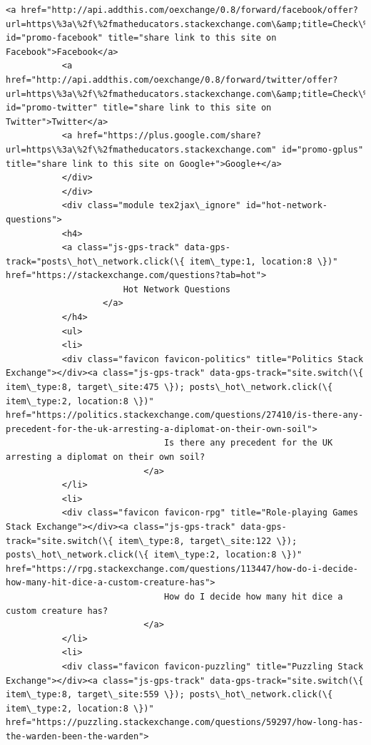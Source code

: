 \documentclass[11pt]{article}
\begin{document}
\begin{Verbatim}[commandchars=\\\{\}]
           <a href="http://api.addthis.com/oexchange/0.8/forward/facebook/offer?url=https\%3a\%2f\%2fmatheducators.stackexchange.com\&amp;title=Check\%20out\%20the\%20new\%20Mathematics\%20Educators\%20Stack\%20Exchange\%20Q\%26A\%20site\%20from\%20Stack\%20Exchange\&amp;username=stackoverflow" id="promo-facebook" title="share link to this site on Facebook">Facebook</a>
           <a href="http://api.addthis.com/oexchange/0.8/forward/twitter/offer?url=https\%3a\%2f\%2fmatheducators.stackexchange.com\&amp;title=Check\%20out\%20the\%20new\%20Mathematics\%20Educators\%20Stack\%20Exchange\%20QnA\%20site\%20from\%20\%40StackExchange\&amp;username=stackoverflow\&amp;template=\%7B\%7Btitle\%7D\%7D\%20\%7B\%7Burl\%7D\%7D" id="promo-twitter" title="share link to this site on Twitter">Twitter</a>
           <a href="https://plus.google.com/share?url=https\%3a\%2f\%2fmatheducators.stackexchange.com" id="promo-gplus" title="share link to this site on Google+">Google+</a>
           </div>
           </div>
           <div class="module tex2jax\_ignore" id="hot-network-questions">
           <h4>
           <a class="js-gps-track" data-gps-track="posts\_hot\_network.click(\{ item\_type:1, location:8 \})" href="https://stackexchange.com/questions?tab=hot">
                       Hot Network Questions
                   </a>
           </h4>
           <ul>
           <li>
           <div class="favicon favicon-politics" title="Politics Stack Exchange"></div><a class="js-gps-track" data-gps-track="site.switch(\{ item\_type:8, target\_site:475 \}); posts\_hot\_network.click(\{ item\_type:2, location:8 \})" href="https://politics.stackexchange.com/questions/27410/is-there-any-precedent-for-the-uk-arresting-a-diplomat-on-their-own-soil">
                               Is there any precedent for the UK arresting a diplomat on their own soil?
                           </a>
           </li>
           <li>
           <div class="favicon favicon-rpg" title="Role-playing Games Stack Exchange"></div><a class="js-gps-track" data-gps-track="site.switch(\{ item\_type:8, target\_site:122 \}); posts\_hot\_network.click(\{ item\_type:2, location:8 \})" href="https://rpg.stackexchange.com/questions/113447/how-do-i-decide-how-many-hit-dice-a-custom-creature-has">
                               How do I decide how many hit dice a custom creature has?
                           </a>
           </li>
           <li>
           <div class="favicon favicon-puzzling" title="Puzzling Stack Exchange"></div><a class="js-gps-track" data-gps-track="site.switch(\{ item\_type:8, target\_site:559 \}); posts\_hot\_network.click(\{ item\_type:2, location:8 \})" href="https://puzzling.stackexchange.com/questions/59297/how-long-has-the-warden-been-the-warden">

\end{Verbatim}
\end{document}
